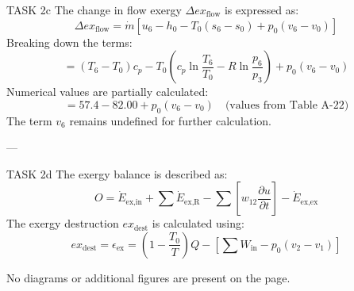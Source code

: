 TASK 2c  
The change in flow exergy \( \Delta ex_{\text{flow}} \) is expressed as:  
\[
\Delta ex_{\text{flow}} = \dot{m} \left[ u_6 - h_0 - T_0 (s_6 - s_0) + p_0 (v_6 - v_0) \right]
\]  
Breaking down the terms:  
\[
= (T_6 - T_0) c_p - T_0 \left( c_p \ln \frac{T_6}{T_0} - R \ln \frac{p_6}{p_3} \right) + p_0 (v_6 - v_0)
\]  
Numerical values are partially calculated:  
\[
= 57.4 - 82.00 + p_0 (v_6 - v_0) \quad \text{(values from Table A-22)}
\]  
The term \( v_6 \) remains undefined for further calculation.

---

TASK 2d  
The exergy balance is described as:  
\[
O = \dot{E}_{\text{ex,in}} + \sum \dot{E}_{\text{ex,R}} - \sum \left[ w_{12} \frac{\partial u}{\partial t} \right] - \dot{E}_{\text{ex,ex}}
\]  
The exergy destruction \( ex_{\text{dest}} \) is calculated using:  
\[
ex_{\text{dest}} = \epsilon_{\text{ex}} = \left( 1 - \frac{T_0}{T} \right) Q - \left[ \sum W_{\text{in}} - p_0 (v_2 - v_1) \right]
\]  

No diagrams or additional figures are present on the page.